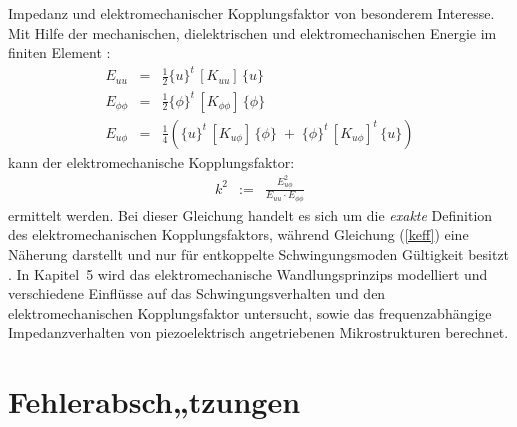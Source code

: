 Impedanz und elektromechanischer Kopplungsfaktor von besonderem
Interesse. Mit Hilfe der mechanischen, dielektrischen und
elektromechanischen Energie im finiten Element \cite{Nai83}:
\begin{eqnarray}
\label{Emech}
E_{uu}& = & \displaystyle \frac{1}{2} \{u\}^{t} \, [K_{uu}] \, \{u\}
\nonumber \\
E_{\phi\phi}& =& \displaystyle \frac{1}{2} \{\phi\}^{t} \, [K_{\phi\phi}] \, \{\phi\}
\\
E_{u\phi}& = & \displaystyle \frac{1}{4} \left( \{u\}^{t} \, [K_{u\phi}] \, \{\phi\}
	      \; + \; \{\phi\}^{t} \, [K_{u\phi}]^{t} \, \{u\} \right)
\nonumber
\end{eqnarray}
kann der elektromechanische Kopplungsfaktor:
\begin{eqnarray}
\label{kfem}
 k^{2} & := & \frac {E_{u\phi}^{2}} {E_{uu} \cdot E_{\phi\phi}}
\end{eqnarray}
ermittelt werden. Bei dieser Gleichung %
handelt es sich um die {\em exakte} Definition des
elektromechanischen Kopplungsfaktors, während
Gleichung (\ref{keff}) eine Näherung darstellt und nur für entkoppelte
Schwingungsmoden Gültigkeit besitzt \cite{Ler90}.
In Kapitel~5 wird das elektromechanische Wandlungsprinzips modelliert und
verschiedene Einflüsse auf das Schwingungsverhalten und den
elektromechanischen Kopplungsfaktor untersucht, sowie das
frequenzabhängige Impedanzverhalten von piezoelektrisch angetriebenen
Mikrostrukturen berechnet.



\section{Fehlerabsch„tzungen}
\label{fehlerabschaetzungen}

